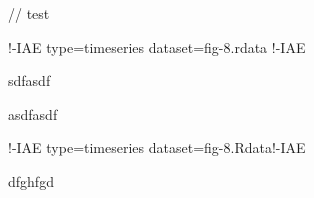 // test

!-IAE type=timeseries dataset=fig-8.rdata !-IAE

sdfasdf

asdfasdf


!-IAE type=timeseries dataset=fig-8.Rdata!-IAE

dfghfgd

